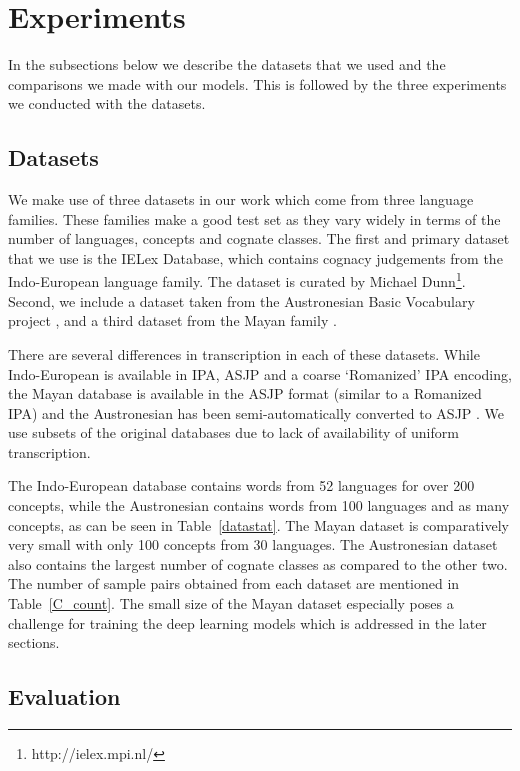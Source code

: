 \documentclass[11pt,letterpaper]{article}
\begin{document}
\section{Experiments}

In the subsections below we describe the datasets that we used and the comparisons we made with our models. This is followed by the three experiments we conducted with the datasets.

\subsection{Datasets}

We make use of three datasets in our work which come from three language families. These families make a good test set as they vary widely in terms of the number of languages, concepts and cognate classes. The first and primary dataset that we use is the IELex Database, which contains cognacy judgements from the Indo-European language family. The dataset is curated by Michael Dunn\footnote{http://ielex.mpi.nl/}. Second, we include a dataset taken from the Austronesian Basic Vocabulary project \cite{greenhillBlust:08}, and a third dataset from the Mayan family \cite{wichmann:2008}. 

There are several differences in transcription in each of these datasets. While Indo-European is available in IPA, ASJP and a coarse `Romanized' IPA encoding, the Mayan database is available in the ASJP format (similar to a Romanized IPA) \cite{Brown:08} and the Austronesian has been semi-automatically converted to ASJP \cite{rama2016siamese}. We use subsets of the original databases due to lack of availability of uniform transcription.

The Indo-European database contains words from 52 languages for over 200 concepts, while the Austronesian contains words from 100 languages and as many concepts, as can be seen in Table~\ref{datastat}. The Mayan dataset is comparatively very small with only 100 concepts from 30 languages. The Austronesian dataset also contains the largest number of cognate classes as compared to the other two. The number of sample pairs obtained from each dataset are mentioned in Table~\ref{C_count}. The small size of the Mayan dataset especially poses a challenge for training the deep learning models which is addressed in the later sections. 


\subsection{Evaluation}
\end{document}

